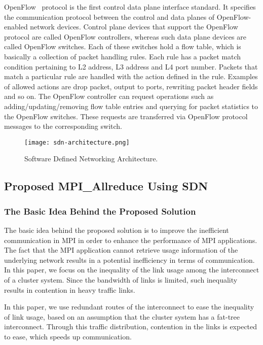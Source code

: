 OpenFlow~\autocite{sdn} protocol is the first control data plane interface
standard. It specifies the communication protocol between the control
and data planes of OpenFlow-enabled network devices. Control plane
devices that support the OpenFlow protocol are called OpenFlow
controllers, whereas such data plane devices are called OpenFlow
switches. Each of these switches hold a flow table, which is basically a
collection of packet handling rules. Each rule has a packet match
condition pertaining to L2 address, L3 address and L4 port number.
Packets that match a particular rule are handled with the action defined
in the rule. Examples of allowed actions are drop packet, output to
ports, rewriting packet header fields and so on. The OpenFlow controller
can request operations such as adding/updating/removing flow table
entries and querying for packet statistics to the OpenFlow switches.
These requests are transferred via OpenFlow protocol messages to the
corresponding switch.

\begin{figure}
    \centering
    \texttt{[image: sdn-architecture.png]}
    \caption{Software Defined Networking Architecture.}%
    \label{fig-sdn-architecture}
\end{figure}

\subsection{Proposed MPI\_Allreduce Using SDN}

\subsubsection{The Basic Idea Behind the Proposed Solution}

The basic idea behind the proposed solution is to improve the
inefficient communication in MPI in order to enhance the performance of
MPI applications. The fact that the MPI application cannot retrieve
usage information of the underlying network results in a potential
inefficiency in terms of communication. In this paper, we focus on the
inequality of the link usage among the interconnect of a cluster system. Since
the bandwidth of links is limited, such inequality results in contention in
heavy traffic links.

In this paper, we use redundant routes of the interconnect to ease the
inequality of link usage, based on an assumption that the cluster system has a
fat-tree interconnect. Through this traffic distribution, contention in the
links is expected to ease, which speeds up communication.


